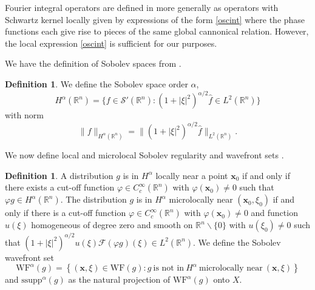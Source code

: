 \documentclass[a4paper,12pt]{amsart}
\numberwithin{equation}{section}
\theoremstyle{plain}
\numberwithin{theorem}{section}
\theoremstyle{definition}
\newtheorem{definition}[theorem]{Definition}
\theoremstyle{remark}
\theoremstyle{remark}
\theoremstyle{remark}
\newcommand{\al}{\alpha}
\newcommand{\WF}{\mathrm{WF}}
\newcommand{\vx}{{\mathbf{x}}}
\newcommand{\seanc}[1]{\begin{quotation}\textbf{Sean's comment:\
}{\textit{#1}}\end{quotation}}
\begin{document}
Fourier integral operators are defined in \cite{hormander} more generally as operators with Schwartz kernel locally given by expressions of the form \eqref{oscint} where the phase functions each give rise to pieces of the same global cannonical relation. However, the local expression \eqref{oscint} is sufficient for our purposes.


We have the definition of Sobolev spaces from \cite[page 200]{natterer}.

\begin{definition}\label{sobo_spaces}
We define the Sobolev space order $\al$,
\begin{equation}
H^\al(\mathbb{R}^n) = \{f\in \mathcal{S}'(\mathbb{R}^n) : (1 + |\xi|^2)^{\al/2} \hat{f} \in L^2(\mathbb{R}^n)\}
\end{equation}
with norm 
\begin{equation}\label{HRnnorm}
\|f\|_{H^{\al}(\mathbb{R}^n)} = \|(1 + |\xi|^2)^{\al/2} \hat{f}\|_{L^2(\mathbb{R}^n)}.
\end{equation}
\end{definition}

\noindent We now define local and microlocal Sobolev regularity and wavefront sets \cite{Q1993sing}.

\begin{definition} \label{def:SobolevWF}
A distribution $g$ is in $H^{\al}$ locally near a point $\vx_0$ if and only if there exists a cut-off function $\varphi \in C_c^{\infty}(\mathbb{R}^n)$ with $\varphi(\vx_0) \neq 0$ such that $\varphi g \in H^{\al}(\mathbb{R}^n)$. The distribution $g$ is in $H^{\al}$ microlocally near $(\vx_0,\xi_0)$ if and only if there is a cut-off function $\varphi \in C^{\infty}_c(\mathbb{R}^n)$ with $\varphi(\vx_0) \neq 0$ and function $u(\xi)$ homogeneous of degree zero and smooth on $\mathbb{R}^n\backslash \{0\}$ with $u(\xi_0)\neq 0$ such that $(1+|\xi|^2)^{\al/2}u(\xi)\mathcal{F}(\varphi g)(\xi) \in L^2(\mathbb{R}^n)$. We define the Sobolev wavefront set
\begin{equation}
\WF^{\al}(g) = \left\{ (\vx,\xi) \in \WF(g) : g\ \text{is not in}\ H^{\al}\ \text{microlocally near}\ (\vx, \xi) \right\}
\end{equation}
and $\text{ssupp}^{\al}(g)$ as the natural projection of $\WF^{\al}(g)$ onto $X$.
\end{definition}
\end{document}
